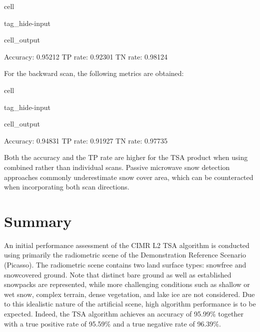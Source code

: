 \documentclass[letterpaper,10pt,english]{jupyterBook}
\begin{document}
\begin{sphinxuseclass}{cell}
\begin{sphinxuseclass}{tag_hide-input}\begin{sphinxVerbatimOutput}

\begin{sphinxuseclass}{cell_output}
\begin{sphinxVerbatim}[commandchars=\\\{\}]
Accuracy: 0.95212
TP rate:  0.92301
TN rate:  0.98124
\end{sphinxVerbatim}

\end{sphinxuseclass}\end{sphinxVerbatimOutput}

\end{sphinxuseclass}
\end{sphinxuseclass}
\sphinxAtStartPar
For the backward scan, the following metrics are obtained:

\begin{sphinxuseclass}{cell}
\begin{sphinxuseclass}{tag_hide-input}\begin{sphinxVerbatimOutput}

\begin{sphinxuseclass}{cell_output}
\begin{sphinxVerbatim}[commandchars=\\\{\}]
Accuracy: 0.94831
TP rate:  0.91927
TN rate:  0.97735
\end{sphinxVerbatim}

\end{sphinxuseclass}\end{sphinxVerbatimOutput}

\end{sphinxuseclass}
\end{sphinxuseclass}
\sphinxAtStartPar
Both the accuracy and the TP rate are higher for the TSA product when using combined rather than individual scans.
Passive microwave snow detection approaches commonly underestimate snow cover area, which can be counteracted when incorporating both scan directions.


\section{Summary}
\label{\detokenize{book/algorithm_performance_assessment:summary}}
\sphinxAtStartPar
An initial performance assessment of the CIMR L2 TSA algorithm is conducted using primarily the radiometric scene of the Demonstration Reference Scenario (Picasso).
The radiometric scene contains two land surface types: snow\sphinxhyphen{}free and snow\sphinxhyphen{}covered ground.
Note that distinct bare ground as well as established snowpacks are represented, while more challenging conditions such as shallow or wet snow, complex terrain, dense vegetation, and lake ice are not considered.
Due to this idealistic nature of the artificial scene, high algorithm performance is to be expected.
Indeed, the TSA algorithm achieves an accuracy of 95.99\% together with a true positive rate of 95.59\% and a true negative rate of 96.39\%.
\end{document}
